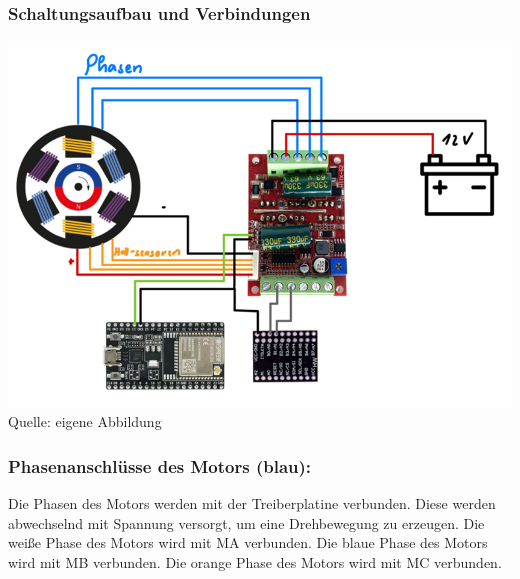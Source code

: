 \documentclass[ngerman,12pt,a4paper]{article}
\begin{document}
			\subsubsection{Schaltungsaufbau und Verbindungen}
			\begin{minipage}{\textwidth}
				\centering
				\includegraphics[scale=1.5]{Pictures/Schaltungsaufbau-1Motor}
				\label{fig:spiffs_init}
				\vspace{-2pt}
				\small Quelle: eigene Abbildung
			\end{minipage}
			\newpage
			\subsubsection*{Phasenanschlüsse des Motors (blau):}
			
			Die Phasen des Motors werden mit der Treiberplatine verbunden. Diese werden abwechselnd mit Spannung versorgt, um eine Drehbewegung zu erzeugen. Die weiße Phase des Motors wird mit MA verbunden. Die blaue Phase des Motors wird mit MB verbunden. Die orange Phase des Motors wird mit MC verbunden. \\[0.5cm]
			
\end{document}
